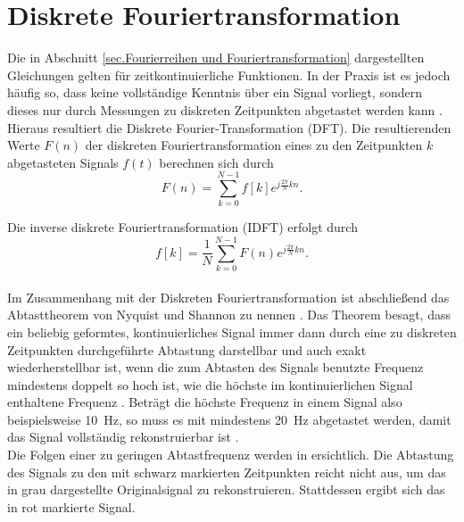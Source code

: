 \section{Diskrete Fouriertransformation}
\label{sec.Diskrete Fouriertransformation}

Die in Abschnitt \ref{sec.Fourierreihen und Fouriertransformation} dargestellten Gleichungen gelten für zeitkontinuierliche Funktionen. In der Praxis ist es jedoch häufig so, dass keine vollständige Kenntnis über ein Signal vorliegt, sondern dieses nur durch Messungen zu diskreten Zeitpunkten abgetastet werden kann \cite{Eichler.2006}. Hieraus resultiert die Diskrete Fourier-Transformation (DFT). Die resultierenden Werte $F(n)$ der diskreten Fouriertransformation eines zu den Zeitpunkten $k$ abgetasteten Signals $f(t)$ berechnen sich durch 
\begin{equation}
	\label{eq:DFT}
	F(n) = \sum_{k=0}^{N-1}f[k]e^{j\frac{2\pi}{N}kn} .
\end{equation}

Die inverse diskrete Fouriertransformation (IDFT) erfolgt durch
\begin{equation}
	\label{eq:IDFT}
	f[k] = \frac{1}{N}\sum_{k=0}^{N-1}F(n)e^{j\frac{2\pi}{N}kn} .
\end{equation} \\
Im Zusammenhang mit der Diskreten Fouriertransformation ist abschließend das Abtasttheorem von Nyquist und Shannon zu nennen \cite{Eichler.2006}. Das Theorem besagt, dass ein beliebig geformtes, kontinuierliches Signal immer dann durch eine zu diskreten Zeitpunkten durchgeführte Abtastung darstellbar und auch exakt wiederherstellbar ist, wenn die zum Abtasten des Signals benutzte Frequenz mindestens doppelt so hoch ist, wie die höchste im kontinuierlichen Signal enthaltene Frequenz \cite{Wendemuth.2005}. Beträgt die höchste Frequenz in einem Signal also beispielsweise \SI{10}{\Hz}, so muss es mit mindestens \SI{20}{\Hz} abgetastet werden, damit das Signal vollständig rekonstruierbar ist  \cite{Wendemuth.2005}. \\
Die Folgen einer zu geringen Abtastfrequenz werden in  ersichtlich. Die Abtastung des Signals zu den mit schwarz markierten Zeitpunkten reicht nicht aus, um das in grau dargestellte Originalsignal zu rekonstruieren. Stattdessen ergibt sich das in rot markierte Signal.

